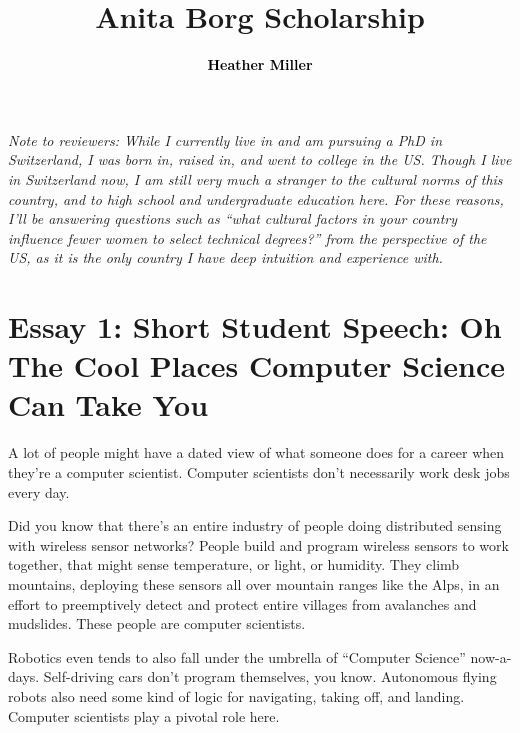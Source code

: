 \documentclass[acmtocl]{acmtrans2m}
\title{{\color{Black}Anita Borg Scholarship}}
\author{\textcolor{Black}{\textbf{Heather Miller}}}
\begin{document}
\setmonofont[Mapping=tex-text,Scale=0.9]{Inconsolata}
%
\maketitle

{\em Note to reviewers: While I currently live in and am pursuing a PhD in
Switzerland, I was born in, raised in, and went to college in the US. Though I
live in Switzerland now, I am still very much a stranger to the cultural norms
of this country, and to high school and undergraduate education here. For
these reasons, I'll be answering questions such as ``what cultural factors in
your country influence fewer women to select technical degrees?'' from the
perspective of the US, as it is the only country I have deep intuition and
experience with.}

\vspace{-0.1in}

\section*{\textbf{Essay 1:} Short Student Speech: Oh The Cool Places Computer Science Can Take You}


A lot of people might have a dated view of what someone does for a career when
they're a computer scientist. Computer scientists don't necessarily work desk
jobs every day.

Did you know that there's an entire industry of people doing distributed
sensing with wireless sensor networks? People build and program wireless
sensors to work together, that might sense temperature, or light, or humidity.
They climb mountains, deploying these sensors all over mountain ranges like
the Alps, in an effort to preemptively detect and protect entire villages from
avalanches and mudslides. These people are computer scientists.

Robotics even tends to also fall under the umbrella of ``Computer Science''
now-a-days. Self-driving cars don't program themselves, you know. Autonomous
flying robots also need some kind of logic for navigating, taking off, and
landing. Computer scientists play a pivotal role here.
\end{document}
